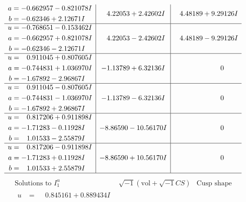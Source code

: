 \documentclass[1p]{elsarticle_modified}
\theoremstyle{definition}
\newcommand{\I}{\sqrt{-1}}
\begin{document}
$$\begin{array}{c|c|c}
\begin{aligned}
a &= -0.662957 - 0.821078 I \\
b &= -0.62346 + 2.12671 I\end{aligned}
 & \phantom{-}4.22053 + 2.42602 I & \phantom{-}4.48189 + 9.29126 I \\ \hline\begin{aligned}
u &= -0.768651 - 0.153462 I \\
a &= -0.662957 + 0.821078 I \\
b &= -0.62346 - 2.12671 I\end{aligned}
 & \phantom{-}4.22053 - 2.42602 I & \phantom{-}4.48189 - 9.29126 I \\ \hline\begin{aligned}
u &= \phantom{-}0.911045 + 0.807605 I \\
a &= -0.744831 + 1.036970 I \\
b &= -1.67892 - 2.96867 I\end{aligned}
 & -1.13789 + 6.32136 I & \phantom{-0.000000 } 0 \\ \hline\begin{aligned}
u &= \phantom{-}0.911045 - 0.807605 I \\
a &= -0.744831 - 1.036970 I \\
b &= -1.67892 + 2.96867 I\end{aligned}
 & -1.13789 - 6.32136 I & \phantom{-0.000000 } 0 \\ \hline\begin{aligned}
u &= \phantom{-}0.817206 + 0.911898 I \\
a &= -1.71283 - 0.11928 I \\
b &= \phantom{-}1.01533 - 2.55879 I\end{aligned}
 & -8.86590 - 10.56170 I & \phantom{-0.000000 } 0 \\ \hline\begin{aligned}
u &= \phantom{-}0.817206 - 0.911898 I \\
a &= -1.71283 + 0.11928 I \\
b &= \phantom{-}1.01533 + 2.55879 I\end{aligned}
 & -8.86590 + 10.56170 I & \phantom{-0.000000 } 0\\
 \hline 
 \end{array}$$\newpage$$\begin{array}{c|c|c}  
\text{Solutions to }I^u_{1}& \I (\text{vol} + \sqrt{-1}CS) & \text{Cusp shape}\\
 \hline 
\begin{aligned}
u &= \phantom{-}0.845161 + 0.889434 I \\

\end{aligned}
\end{array}$$
\end{document}
